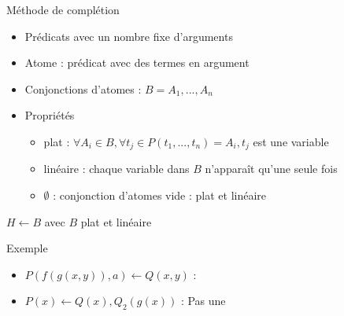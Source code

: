 \begin{frame}{Méthode de complétion}
  \begin{center}
  \end{center}
\end{frame}

\begin{frame}{\csclause}
  \begin{itemize}[<+->]
  \item Prédicats avec un nombre fixe d'arguments
  \item Atome : prédicat avec des termes en argument
  \item Conjonctions d'atomes : $B = A_1, ..., A_n$
  \item Propriétés
    \begin{itemize}
    \item plat : $\forall A_i \in B, \forall t_j \in P(t_1, ..., t_n) = A_i, t_j$ est une variable
    \item linéaire : chaque variable dans $B$ n'apparaît qu'une seule fois
    \item $\emptyset$ : conjonction d'atomes vide : plat et linéaire
    \end{itemize}
  \end{itemize}
  \begin{block}{\csclause}
    $H \leftarrow B$ avec $B$ plat et linéaire
  \end{block}
  \begin{exampleblock}{Exemple}
    \begin{itemize}
     \item $P(f(g(x,y)),a) \leftarrow Q(x,y)$ : \csclause
     \item $P(x) \leftarrow Q(x),Q_2(g(x))$ : Pas une \csclause
    \end{itemize}
  \end{exampleblock}
\end{frame}

